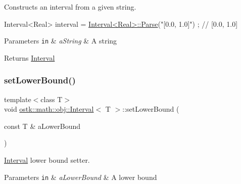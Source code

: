 Constructs an interval from a given string. 


\begin{DoxyCode}
Interval<Real> interval = \hyperlink{classostk_1_1math_1_1obj_1_1_interval_a8013b6fe2914101612ae83ee815110e4}{Interval<Real>::Parse}(\textcolor{stringliteral}{"[0.0, 1.0]"}) ; \textcolor{comment}{// [0.0, 1.0]}
\end{DoxyCode}



\begin{DoxyParams}[1]{Parameters}
\mbox{\tt in}  & {\em a\+String} & A string \\
\hline
\end{DoxyParams}
\begin{DoxyReturn}{Returns}
\hyperlink{classostk_1_1math_1_1obj_1_1_interval}{Interval} 
\end{DoxyReturn}
\mbox{\label{classostk_1_1math_1_1obj_1_1_interval_a958544f14f36300f89e383351279299d}} 
\subsubsection{\texorpdfstring{set\+Lower\+Bound()}{setLowerBound()}}
{\footnotesize\ttfamily template$<$class T$>$ \\
void \hyperlink{classostk_1_1math_1_1obj_1_1_interval}{ostk\+::math\+::obj\+::\+Interval}$<$ T $>$\+::set\+Lower\+Bound (\begin{DoxyParamCaption}\item[{const T \&}]{a\+Lower\+Bound }\end{DoxyParamCaption})}



\hyperlink{classostk_1_1math_1_1obj_1_1_interval}{Interval} lower bound setter. 


\begin{DoxyParams}[1]{Parameters}
\mbox{\tt in}  & {\em a\+Lower\+Bound} & A lower bound \\
\hline
\end{DoxyParams}
\mbox{\label{classostk_1_1math_1_1obj_1_1_interval_a84876dff7017bf9ebb5c7ef71aefffc7}} 
